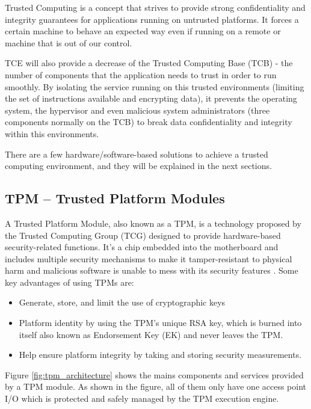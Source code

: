 Trusted Computing is a concept that strives to provide strong confidentiality and integrity guarantees for applications running on untrusted platforms. It forces a certain machine to behave an expected way even if running on a remote or machine that is out of our control.

\gls{TCE} will also provide a decrease of the Trusted Computing Base (\gls{TCB}) - the number of components that the application needs to trust in order to run smoothly. By isolating the service running on this trusted environments (limiting the set of instructions available and encrypting data), it prevents the operating system, the hypervisor and even malicious system administrators (three components normally on the \gls{TCB}) to break data confidentiality and integrity within this environments.

There are a few hardware/software-based solutions to achieve a trusted computing environment, and they will be explained in the next sections.

\subsection{TPM – Trusted Platform Modules } %
\label{ssec:trusted_platform_modules}

A Trusted Platform Module, also known as a \gls{TPM}, is a technology proposed by the Trusted Computing Group (\gls{TCG}) designed to provide hardware-based security-related functions. It's a chip embedded into the motherboard and includes multiple security mechanisms to make it tamper-resistant to physical harm and malicious software is unable to mess with its security features \cite{tpm:1}. Some key advantages of using \glspl{TPM} are:

\begin{itemize}
	\item Generate, store, and limit the use of cryptographic keys
	\item Platform identity by using the TPM’s unique RSA key, which is burned into itself also known as Endorsement Key (\gls{EK}) and never leaves the \gls{TPM}.
	\item Help ensure platform integrity by taking and storing security measurements.
\end{itemize}

Figure \ref{fig:tpm_architecture} shows the mains components and services provided by a \gls{TPM} module. As shown in the figure, all of them only have one access point \gls{I/O} which is protected and safely managed by the \gls{TPM} execution engine.

